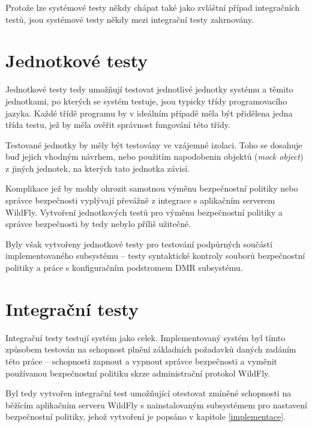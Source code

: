 Protože lze systémové testy někdy chápat také jako zvláštní případ integračních testů, jsou systémové testy někdy mezi integrační testy zahrnovány. \cite{testsUnitVsInteg}

\section{Jednotkové testy}

Jednotkové testy tedy umožňují testovat jednotlivé jednotky systému a těmito jednotkami, po kterých se systém testuje, jsou typicky třídy programovacího jazyka. Každé třídě programu by v ideálním případě měla být přidělena jedna třída testu, jež by měla ověřit správnost fungování této třídy.

Testované jednotky by měly být testovány ve vzájemné izolaci. Toho se dosahuje buď jejich vhodným návrhem, nebo použitím napodobenin objektů ({\it mock object}) z jiných jednotek, na kterých tato jednotka závisí.

Komplikace jež by mohly ohrozit samotnou výměnu bezpečnostní politiky nebo správce bezpečnosti vyplývají převážně z integrace s aplikačním serverem WildFly. Vytvoření jednotkových testů pro výměnu bezpečnostní politiky a správce bezpečnosti by tedy nebylo příliš užitečné.

Byly však vytvořeny jednotkové testy pro testování podpůrných součástí implementovaného subsystému -- testy syntaktické kontroly souborů bezpečnostní politiky a práce s konfiguračním podstromem DMR subsystému.

\section{Integrační testy}

Integrační testy testují systém jako celek. Implementovaný systém byl tímto způsobem testován na schopnost plnění základních požadavků daných zadáním této práce -- schopnosti zapnout a vypnout správce bezpečnosti a vyměnit používanou bezpečnostní politiku skrze administrační protokol WildFly.

Byl tedy vytvořen integrační test umožňující otestovat zmíněné schopnosti na běžícím aplikačním serveru WildFly s nainstalovaným subsystémem pro nastavení bezpečnostní politiky, jehož vytvoření je popsáno v kapitole \ref{implementace}.

